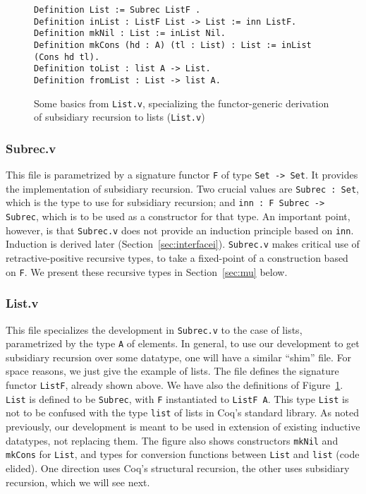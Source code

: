 \documentclass[a4paper,USenglish]{lipics-v2021}
\begin{document}
\begin{figure}
  \begin{verbatim}
Definition List := Subrec ListF .
Definition inList : ListF List -> List := inn ListF.
Definition mkNil : List := inList Nil.
Definition mkCons (hd : A) (tl : List) : List := inList (Cons hd tl).
Definition toList : list A -> List.
Definition fromList : List -> list A.
\end{verbatim}
  \caption{Some basics from \texttt{List.v}, specializing the functor-generic derivation of subsidiary recursion to lists (\texttt{List.v})}
  \label{fig:listf}
\end{figure}

\subsubsection{Subrec.v}

  This file is parametrized by a signature functor \verb|F| of type
  \verb|Set -> Set|.  It provides the implementation of subsidiary
  recursion.  Two crucial values are \verb|Subrec : Set|, which is the
  type to use for subsidiary recursion; and
  \verb|inn : F Subrec -> Subrec|, which is to be used as a
  constructor for that type.  An important point, however, is that
  \verb|Subrec.v| does not provide an induction principle based on
  \verb|inn|.  Induction is derived later
  (Section~\ref{sec:interfacei}). \verb|Subrec.v| makes critical use
  of retractive-positive recursive types, to take a fixed-point of a
  construction based on \verb|F|.  We present these recursive
  types in Section~\ref{sec:mu} below.

  \subsubsection{List.v}

  This file specializes the development in \verb|Subrec.v| to the case
  of lists, parametrized by the type \verb|A| of elements.  In
  general, to use our development to get subsidiary recursion over
  some datatype, one will have a similar ``shim'' file.  For space
  reasons, we just give the example of lists.  The file defines the
  signature functor \verb|ListF|, already shown above.  We have
  also the definitions of Figure~\ref{fig:listf}.  \verb|List| is defined to be \verb|Subrec|, with
   \verb|F| instantiated to \verb|ListF A|.  This type \verb|List| is not to be
  confused with the type \verb|list| of lists in Coq's standard
  library.  As noted previously, our development is meant to be used
  in extension of existing inductive datatypes, not replacing them.
  The figure also shows constructors \verb|mkNil| and \verb|mkCons|
  for \verb|List|, and types for conversion functions between
  \verb|List| and \verb|list| (code elided). One direction uses Coq's structural
  recursion, the other uses subsidiary recursion, which we will
  see next. 
  
\end{document}
